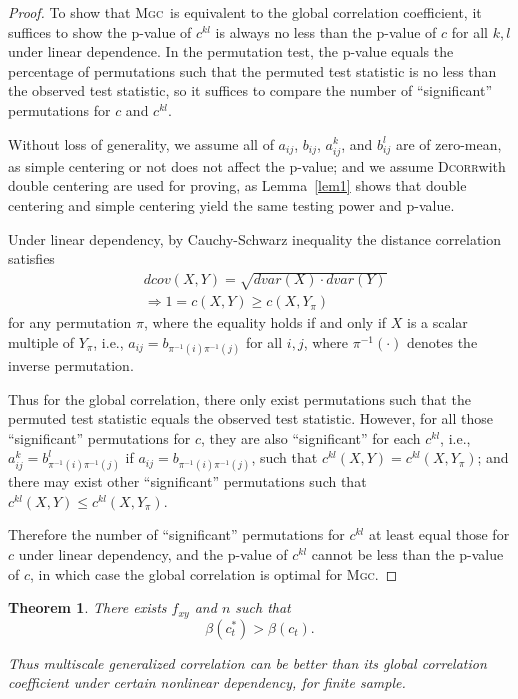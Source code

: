 \documentclass[11pt]{article}
\providecommand{\sct}[1]{{\normalfont\textsc{#1}}}
\newcommand{\G}{c}
\newcommand{\Mgc}{\sct{Mgc}}
\newcommand{\Dcorr}{\sct{Dcorr}}
\newtheorem{appThm}{Theorem}
\begin{document}
\begin{proof}
To show that \Mgc~is equivalent to the global correlation coefficient, it suffices to show the p-value of $\G^{kl}$ is always no less than the p-value of $\G$ for all $k,l$ under linear dependence. In the permutation test, the p-value equals the percentage of permutations such that the permuted test statistic is no less than the observed test statistic, so it suffices to compare the number of ``significant'' permutations for $\G$ and $\G^{kl}$.

Without loss of generality, we assume all of $a_{ij}$, $b_{ij}$, $a_{ij}^{k}$, and $b_{ij}^{l}$ are of zero-mean, as simple centering or not does not affect the p-value; and we assume \Dcorr with double centering are used for proving, as Lemma~\ref{lem1} shows that double centering and simple centering yield the same testing power and p-value.

Under linear dependency, by Cauchy-Schwarz inequality the distance correlation satisfies
\begin{align*}
& dcov(X,Y) = \sqrt{dvar(X) \cdot dvar(Y)} \\
& \Rightarrow 1=\G(X, Y) \geq \G(X, Y_{\pi})
\end{align*}
for any permutation $\pi$, where the equality holds if and only if $X$ is a scalar multiple of $Y_{\pi}$, i.e., $a_{ij}=b_{\pi^{-1}(i) \pi^{-1}(j)}$ for all $i,j$, where $\pi^{-1}(\cdot)$ denotes the inverse permutation. %

Thus for the global correlation, there only exist permutations such that the permuted test statistic equals the observed test statistic. However, for all those ``significant'' permutations for $\G$, they are also ``significant'' for each $\G^{kl}$, i.e., $a_{ij}^{k}=b_{\pi^{-1}(i) \pi^{-1}(j)}^{l}$ if $a_{ij}=b_{\pi^{-1}(i) \pi^{-1}(j)}$, such that $\G^{kl}(X, Y)=\G^{kl}(X, Y_{\pi})$; and there may exist other ``significant'' permutations such that $\G^{kl}(X, Y) \leq \G^{kl}(X, Y_{\pi})$.

Therefore the number of ``significant'' permutations for $\G^{kl}$ at least equal those for $\G$ under linear dependency, and the p-value of $\G^{kl}$ cannot be less than the p-value of $\G$, in which case the global correlation is optimal for \Mgc. 
\end{proof}


\begin{appThm}
There exists $f_{xy}$ and $n$ such that
\begin{equation*}
\beta(\G^{*}_{t}) > \beta(\G_{t}).
\end{equation*}

Thus multiscale generalized correlation can be better than its global correlation coefficient under certain nonlinear dependency, for finite sample.
\end{appThm}
\end{document}
